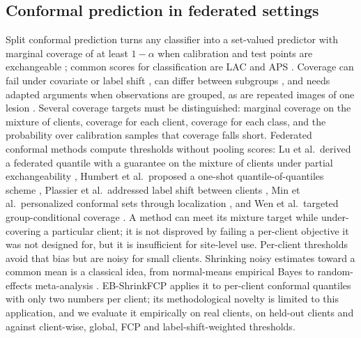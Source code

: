 \subsection{Conformal prediction in federated settings}

Split conformal prediction turns any classifier into a set-valued predictor with marginal coverage of at
least $1-\alpha$ when calibration and test points are exchangeable
\cite{vovk2005algorithmic,angelopoulos2023gentle}; common scores for classification
are LAC \cite{sadinle2019lac} and APS \cite{romano2020aps}. Coverage can fail under
covariate or label shift \cite{tibshirani2019covariate,podkopaev2021labelshift,barber2023beyond}, can
differ between subgroups \cite{lu2022fair}, and needs adapted arguments when observations are grouped,
as are repeated images of one lesion \cite{dunn2022hierarchical,lee2023hierarchical}. Several coverage
targets must be distinguished: marginal coverage on the mixture of clients, coverage for each client,
coverage for each class, and the probability over calibration samples that coverage falls short.
Federated conformal methods compute thresholds without pooling scores: Lu et al.\ derived a federated
quantile with a guarantee on the mixture of clients under partial exchangeability
\cite{lu2023fcp}, Humbert et al.\ proposed a one-shot quantile-of-quantiles scheme
\cite{humbert2023oneshot}, Plassier et al.\ addressed label shift between clients
\cite{plassier2023labelshift}, Min et al.\ personalized conformal sets through localization
\cite{min2025pfcp}, and Wen et al.\ targeted group-conditional coverage \cite{wen2026gcfcp}. A method can
meet its mixture target while under-covering a particular client; it is not disproved by failing a per-client objective it was not designed for, but it is insufficient for site-level use. Per-client thresholds avoid that bias
but are noisy for small clients. Shrinking noisy estimates toward a common mean is a classical idea,
from normal-means empirical Bayes \cite{efron1975stein} to random-effects meta-analysis
\cite{dersimonian1986meta}. EB-ShrinkFCP applies it to per-client conformal quantiles with only two
numbers per client; its methodological novelty is limited to this application, and we evaluate it
empirically on real clients, on held-out clients and against client-wise, global, FCP and
label-shift-weighted thresholds.
